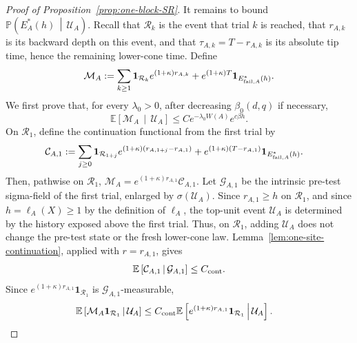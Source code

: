 \documentclass[letterpaper,11pt,reqno]{amsart}
\theoremstyle{definition}
\begin{document}
\begin{proof}[Proof of Proposition~\ref{prop:one-block-SR}]
It remains to bound $\mathbb P\left(E_A^*(h)\,\middle|\,\mathcal U_A\right)$.
Recall that \(\mathcal R_k\) is the event that trial \(k\) is reached, that
\(r_{A,k}\) is its backward depth on this event, and that
\(\tau_{A,k}=T-r_{A,k}\) is its absolute tip time, hence the remaining
lower-cone time.
Define
\[
        \mathcal M_A
        :=
        \sum_{k\ge1}
        \mathbf 1_{\mathcal R_k}
        e^{(1+\kappa)r_{A,k}}
        +
        e^{(1+\kappa) T}
        \mathbf 1_{E_{{\rm fail},A}^*(h)} .
\]
We first prove that, for every \(\lambda_0>0\), after decreasing
\(\beta_0(d,q)\) if necessary,
\begin{equation}\label{eq:MA-bound}
        \mathbb E\left[
            \mathcal M_A
            \,\middle|\,
            \mathcal U_A
        \right]
        \le
        C e^{-\lambda_0W(A)}e^{c\beta h}.
\end{equation}
On \(\mathcal R_1\), define the continuation functional from the first trial by
\[
\begin{aligned}
        \mathcal C_{A,1}
        &:=
        \sum_{j\ge0}
        \mathbf 1_{\mathcal R_{1+j}}
        e^{(1+\kappa)(r_{A,1+j}-r_{A,1})}
        +
        e^{(1+\kappa)(T-r_{A,1})}
        \mathbf 1_{E_{{\rm fail},A}^*(h)} .
\end{aligned}
\]
Then, pathwise on \(\mathcal R_1\), $\mathcal M_A
        =
        e^{(1+\kappa)r_{A,1}}\mathcal C_{A,1}$.
Let \(\mathcal G_{A,1}\) be the intrinsic pre-test sigma-field of the first
trial, enlarged by \(\sigma(\mathcal U_A)\). Since \(r_{A,1}\ge h\) on
\(\mathcal R_1\), and since
\(h=\ell_A(X)\ge1\) by the definition of \(\ell_A\), the top-unit event
\(\mathcal U_A\) is determined by the history exposed above the first trial.
Thus, on \(\mathcal R_1\), adding \(\mathcal U_A\) does not change the
pre-test state or the fresh lower-cone law.
Lemma~\ref{lem:one-site-continuation}, applied with
\(r=r_{A,1}\), gives
\[
        \mathbb E\left[
            \mathcal C_{A,1}
            \,\middle|\,
            \mathcal G_{A,1}
        \right]
        \le C_{\rm cont}.
\]
Since
\(e^{(1+\kappa)r_{A,1}}\mathbf 1_{\mathcal R_1}\) is
\(\mathcal G_{A,1}\)-measurable,
\[
\begin{aligned}
        \mathbb E\left[
            \mathcal M_A\mathbf 1_{\mathcal R_1}
            \,\middle|\,
            \mathcal U_A
        \right]
        &\le
        C_{\rm cont}
        \mathbb E\left[
            e^{(1+\kappa)r_{A,1}}
            \mathbf 1_{\mathcal R_1}
            \,\middle|\,
            \mathcal U_A
        \right].
\end{aligned}
\]
\end{proof}
\end{document}
